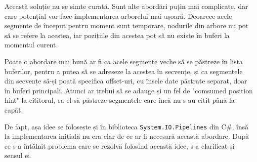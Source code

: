 \documentclass[a4paper,12pt]{report}
\begin{document}
Această soluție nu se simte curată.
Sunt alte abordări puțin mai complicate, dar care potențial vor face implementarea arborelui mai ușoară.
Deoarece acele segmente de început pentru moment sunt temporare,
nodurile din arbore nu pot să se refere la acestea, iar pozițiile din acestea pot să nu existe în buferi la momentul curent.

Poate o abordare mai bună ar fi ca acele segmente veche să se păstreze în lista buferilor,
pentru a putea să se adreseze la acestea în secvențe,
și ca segmentele din secvențe să-și poată specifica offset-uri,
cu însele date păstrate separat, doar în buferi principali.
Atunci ar trebui să se adauge și un fel de "comsumed position hint" la cititorul,
ca el să păstreze segmentele care încă nu s-au citit până la capăt.

De fapt, așa idee se folosește și în biblioteca \texttt{System.IO.Pipelines} din C\#,
însă la implementarea inițială nu era clar de ce ar fi necesară această abordare.
După ce s-a întâlnit problema care se rezolvă folosind această idee, s-a clarificat și sensul ei.











\newpage
{}





\appendix

\renewcommand{\thechapter}{\arabic{chapter}}


\setcounter{chapter}{1}

\end{document}
